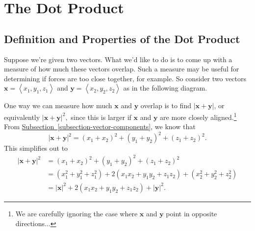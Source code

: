 \documentclass[10pt,]{book}
\theoremstyle{ptxplainnotitle}
\theoremstyle{ptxplaintitle}
\theoremstyle{ptxplainnotitle}
\theoremstyle{ptxplaintitle}
\theoremstyle{ptxplainnotitle}
\theoremstyle{ptxplaintitle}
\theoremstyle{ptxdefinitionnotitle}
\theoremstyle{ptxdefinitiontitle}
\theoremstyle{ptxdefinitionnotitle}
\theoremstyle{ptxdefinitiontitle}
\theoremstyle{ptxdefinitionnotitle}
\theoremstyle{ptxdefinitiontitle}
\theoremstyle{ptxdefinitionnotitle}
\theoremstyle{ptxdefinitiontitle}
\theoremstyle{ptxdefinitionnotitle}
\theoremstyle{ptxdefinitiontitle}
\numberwithin{equation}{section}
\newcommand{\vv}[1]{\mathbf{#1}}
\newcommand{\dotprod}[1]{\left\langle #1 \right\rangle}
\begin{document}
\section[{The Dot Product}]{The Dot Product}\label{section-the-dot-product}
\typeout{************************************************}
\typeout{************************************************}
\subsection[{Definition and Properties of the Dot Product}]{Definition and Properties of the Dot Product}\label{subsection-definition-and-properties-of-the-dot-product}
\hypertarget{p-782}{}%
Suppose we're given two vectors. What we'd like to do is to come up with a measure of how much these vectors overlap. Such a measure may be useful for determining if forces are too close together, for example. So consider two vectors \(\vv{x} = \dotprod{x_{1},y_{1},z_{1}}\) and \(\vv{y} = \dotprod{x_{2},y_{2},z_{2}}\) as in the following diagram.%
\begin{figure}
\centering
{
}
\end{figure}
\hypertarget{p-783}{}%
One way we can measure how much \(\vv{x}\) and \(\vv{y}\) overlap is to find \(|\vv{x}+\vv{y}|\), or equivalently \(|\vv{x}+\vv{y}|^{2},\) since this is larger if \(\vv{x}\) and \(\vv{y}\) are more closely aligned.\footnote{We are carefully ignoring the case where \(\vv{x}\) and \(\vv{y}\) point in opposite directions...\label{fn-5}} From \hyperref[subsection-vector-components]{Subsection~\ref{subsection-vector-components}}, we know that%
%
\begin{equation*}
|\vv{x}+\vv{y}|^{2} = (x_{1}+x_{2})^{2} + (y_{1}+y_{2})^{2} + (z_{1}+z_{2})^{2}.
\end{equation*}
\hypertarget{p-784}{}%
This simplifies out to%
%
\begin{align*}
|\vv{x}+\vv{y}|^{2} & = (x_{1}+x_{2})^{2} + (y_{1}+y_{2})^{2} + (z_{1}+z_{2})^{2} \\
& = (x_{1}^{2}+y_{1}^{2}+z_{1}^{2}) + 2(x_{1}x_{2} + y_{1}y_{2} + z_{1}z_{2}) + (x_{2}^{2} + y_{2}^{2} + z_{2}^{2}) \\
& = |\vv{x}|^{2} + 2(x_{1}x_{2} + y_{1}y_{2} + z_{1}z_{2}) + |\vv{y}|^{2}. 
\end{align*}
\end{document}
